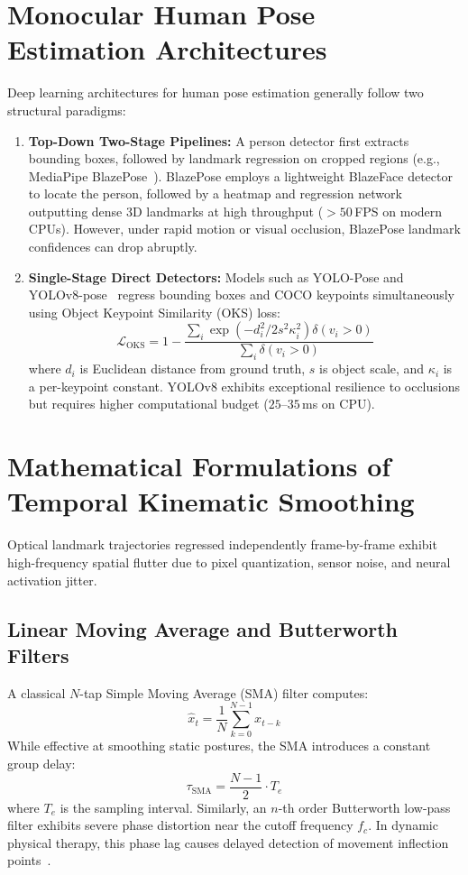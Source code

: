 \documentclass[12pt]{report}
\begin{document}
\section{Monocular Human Pose Estimation Architectures}
Deep learning architectures for human pose estimation generally follow two structural paradigms:
\begin{enumerate}
    \item \textbf{Top-Down Two-Stage Pipelines:} A person detector first extracts bounding boxes, followed by landmark regression on cropped regions (e.g., MediaPipe BlazePose~\cite{bazarevsky2020blazepose}). BlazePose employs a lightweight BlazeFace detector to locate the person, followed by a heatmap and regression network outputting dense 3D landmarks at high throughput ($>50$\,FPS on modern CPUs). However, under rapid motion or visual occlusion, BlazePose landmark confidences can drop abruptly.
    \item \textbf{Single-Stage Direct Detectors:} Models such as YOLO-Pose and YOLOv8-pose~\cite{maji2022yolopose, redmon2016yolo} regress bounding boxes and COCO keypoints simultaneously using Object Keypoint Similarity (OKS) loss:
    \begin{equation}
        \mathcal{L}_{\text{OKS}} = 1 - \frac{\sum_i \exp\left( -d_i^2 / 2s^2 \kappa_i^2 \right) \delta(v_i > 0)}{\sum_i \delta(v_i > 0)}
    \end{equation}
    where $d_i$ is Euclidean distance from ground truth, $s$ is object scale, and $\kappa_i$ is a per-keypoint constant. YOLOv8 exhibits exceptional resilience to occlusions but requires higher computational budget ($25\text{--}35$\,ms on CPU).
\end{enumerate}

\section{Mathematical Formulations of Temporal Kinematic Smoothing}
Optical landmark trajectories regressed independently frame-by-frame exhibit high-frequency spatial flutter due to pixel quantization, sensor noise, and neural activation jitter. 

\subsection{Linear Moving Average and Butterworth Filters}
A classical $N$-tap Simple Moving Average (SMA) filter computes:
\begin{equation}
    \hat{x}_t = \frac{1}{N} \sum_{k=0}^{N-1} x_{t-k}
\end{equation}
While effective at smoothing static postures, the SMA introduces a constant group delay:
\begin{equation}
    \tau_{\text{SMA}} = \frac{N - 1}{2} \cdot T_e
\end{equation}
where $T_e$ is the sampling interval. Similarly, an $n$-th order Butterworth low-pass filter exhibits severe phase distortion near the cutoff frequency $f_c$. In dynamic physical therapy, this phase lag causes delayed detection of movement inflection points~\cite{casiez2012euro}.
\end{document}
